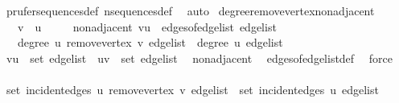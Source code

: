 \begin{isabellebody}
\ prufer{\isacharunderscore}{\kern0pt}sequences{\isacharunderscore}{\kern0pt}def\ n{\isacharunderscore}{\kern0pt}sequences{\isacharunderscore}{\kern0pt}def\ \isamarkupfalse%
\ auto%
\endisatagproof
{\isafoldproof}%
%
\isadelimproof
\isanewline
%
\endisadelimproof
\isanewline
{}\isamarkupfalse%
\ degree{\isacharunderscore}{\kern0pt}remove{\isacharunderscore}{\kern0pt}vertex{\isacharunderscore}{\kern0pt}non{\isacharunderscore}{\kern0pt}adjacent{\isacharcolon}{\kern0pt}\isanewline
\ \ \ {\isachardoublequoteopen}v\ {\isasymnoteq}\ u{\isachardoublequoteclose}\isanewline
\ \ \ \ \ non{\isacharunderscore}{\kern0pt}adjacent{\isacharcolon}{\kern0pt}\ {\isachardoublequoteopen}{\isacharbraceleft}{\kern0pt}v{\isacharcomma}{\kern0pt}u{\isacharbraceright}{\kern0pt}\ {\isasymnotin}\ edges{\isacharunderscore}{\kern0pt}of{\isacharunderscore}{\kern0pt}edge{\isacharunderscore}{\kern0pt}list\ edge{\isacharunderscore}{\kern0pt}list{\isachardoublequoteclose}\isanewline
\ \ \ {\isachardoublequoteopen}degree\ u\ {\isacharparenleft}{\kern0pt}remove{\isacharunderscore}{\kern0pt}vertex\ v\ edge{\isacharunderscore}{\kern0pt}list{\isacharparenright}{\kern0pt}\ {\isacharequal}{\kern0pt}\ degree\ u\ edge{\isacharunderscore}{\kern0pt}list{\isachardoublequoteclose}\isanewline
%
\isadelimproof
%
\endisadelimproof
%
\isatagproof
{}\isamarkupfalse%
\ {\isacharminus}{\kern0pt}\isanewline
\ \ \isamarkupfalse%
\ {\isachardoublequoteopen}{\isacharparenleft}{\kern0pt}v{\isacharcomma}{\kern0pt}u{\isacharparenright}{\kern0pt}\ {\isasymnotin}\ set\ edge{\isacharunderscore}{\kern0pt}list\ {\isasymand}\ {\isacharparenleft}{\kern0pt}u{\isacharcomma}{\kern0pt}v{\isacharparenright}{\kern0pt}\ {\isasymnotin}\ set\ edge{\isacharunderscore}{\kern0pt}list{\isachardoublequoteclose}\ \isamarkupfalse%
\ non{\isacharunderscore}{\kern0pt}adjacent\ \isamarkupfalse%
\ edges{\isacharunderscore}{\kern0pt}of{\isacharunderscore}{\kern0pt}edge{\isacharunderscore}{\kern0pt}list{\isacharunderscore}{\kern0pt}def\ \isamarkupfalse%
\ force\isanewline
\ \ \isamarkupfalse%
\ \isamarkupfalse%
\ {\isachardoublequoteopen}set\ {\isacharparenleft}{\kern0pt}incident{\isacharunderscore}{\kern0pt}edges\ u\ {\isacharparenleft}{\kern0pt}remove{\isacharunderscore}{\kern0pt}vertex\ v\ edge{\isacharunderscore}{\kern0pt}list{\isacharparenright}{\kern0pt}{\isacharparenright}{\kern0pt}\ {\isacharequal}{\kern0pt}\ set\ {\isacharparenleft}{\kern0pt}incident{\isacharunderscore}{\kern0pt}edges\ u\ edge{\isacharunderscore}{\kern0pt}list{\isacharparenright}{\kern0pt}{\isachardoublequoteclose}\ \isamarkupfalse%

\end{isabellebody}
